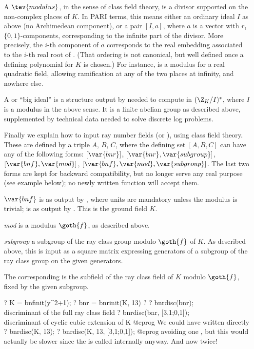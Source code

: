 \label{se:CFT}

A $\tev{modulus}$, in the sense of class field theory, is a divisor supported
on the non-complex places of $K$. In PARI terms, this means either an
ordinary ideal $I$ as above (no Archimedean component), or a pair $[I,a]$,
where $a$ is a vector with $r_1$ $\{0,1\}$-components, corresponding to the
infinite part of the divisor. More precisely, the $i$-th component of $a$
corresponds to the real embedding associated to the $i$-th real root of
. (That ordering is not canonical, but well defined once a
defining polynomial for $K$ is chosen.) For instance, \kbd{[1, [1,1]]} is a
modulus for a real quadratic field, allowing ramification at any of the two
places at infinity, and nowhere else.

A  or ``big ideal'' is a structure output by 
needed to compute in $(\Z_K/I)^*$, where $I$ is a modulus in the above sense.
It is a finite abelian group as described above, supplemented by
technical data needed to solve discrete log problems.

Finally we explain how to input ray number fields (or ), using class
field theory. These are defined by a triple $A$, $B$, $C$, where the
defining set $[A,B,C]$ can have any of the following forms: $[\var{bnr}]$,
$[\var{bnr},\var{subgroup}]$, $[\var{bnf},\var{mod}]$,
$[\var{bnf},\var{mod},\var{subgroup}]$. The last two forms are kept for
backward compatibility, but no longer serve any real purpose (see example
below); no newly written function will accept them.

\item $\var{bnf}$ is as output by , where units are mandatory
unless the modulus is trivial;  is as output by . This
is the ground field $K$.

\item \emph{mod} is a modulus $\goth{f}$, as described above.

\item \emph{subgroup} a subgroup of the ray class group modulo $\goth{f}$ of
$K$. As described above, this is input as a square matrix expressing
generators of a subgroup of the ray class group  on the
given generators.

The corresponding  is the subfield of the ray class field of $K$
modulo $\goth{f}$, fixed by the given subgroup.

\bprog
  ? K = bnfinit(y^2+1);
  ? bnr = bnrinit(K, 13)
  ? %
  ? bnrdisc(bnr); \\ discriminant of the full ray class field
  ? bnrdisc(bnr, [3,1;0,1]); \\ discriminant of cyclic cubic extension of K
@eprog\noindent
We could have written directly
\bprog
  ? bnrdisc(K, 13);
  ? bnrdisc(K, 13, [3,1;0,1]);
@eprog\noindent
avoiding one , but this would actually be slower since the
 is called internally anyway. And now twice!


